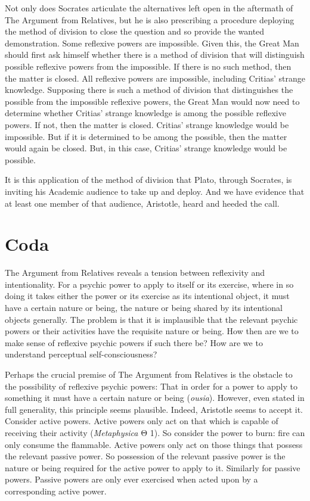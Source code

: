 Not only does Socrates articulate the alternatives left open in the aftermath of The Argument from Relatives, but he is also prescribing a procedure deploying the method of division to close the question and so provide the wanted demonstration. Some reflexive powers are impossible. Given this, the Great Man should first ask himself whether there is a method of division that will distinguish possible reflexive powers from the impossible. If there is no such method, then the matter is closed. All reflexive powers are impossible, including Critias' strange knowledge. Supposing there is such a method of division that distinguishes the possible from the impossible reflexive powers, the Great Man would now need to determine whether Critias' strange knowledge is among the possible reflexive powers. If not, then the matter is closed. Critias' strange knowledge would be impossible. But if it is determined to be among the possible, then the matter would again be closed. But, in this case, Critias' strange knowledge would be possible.

It is this application of the method of division that Plato, through Socrates, is inviting his Academic audience to take up and deploy. And we have evidence that at least one member of that audience, Aristotle, heard and heeded the call.


\section{Coda} %
\label{sec:coda}

The Argument from Relatives reveals a tension between reflexivity and intentionality. For a psychic power to apply to itself or its exercise, where in so doing it takes either the power or its exercise as its intentional object, it must have a certain nature or being, the nature or being shared by its intentional objects generally. The problem is that it is implausible that the relevant psychic powers or their activities have the requisite nature or being. How then are we to make sense of reflexive psychic powers if such there be? How are we to understand perceptual self-consciousness?

Perhaps the crucial premise of The Argument from Relatives is the obstacle to the possibility of reflexive psychic powers: That in order for a power to apply to something it must have a certain nature or being (\emph{ousia}). However, even stated in full generality, this principle seems plausible. Indeed, Aristotle seems to accept it. Consider active powers. Active powers only act on that which is capable of receiving their activity (\emph{Metaphysica} {\sbl Θ} 1). So consider the power to burn: fire can only consume the flammable. Active powers only act on those things that possess the relevant passive power. So possession of the relevant passive power is the nature or being required for the active power to apply to it. Similarly for passive powers. Passive powers are only ever exercised when acted upon by a corresponding active power.


